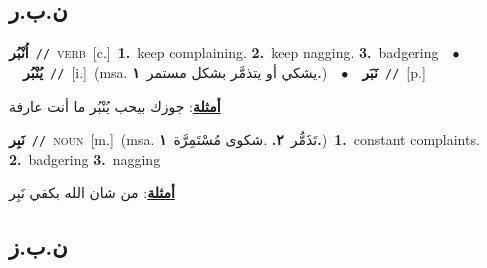 \documentclass[10pt,a4paper,twoside]{article} %
\begin{document}
\begin{multicols}{2}
{{{\vspace{-3mm}
\subsection*{\color{blue}\foreignlanguage{arabic}{ن.ب.ر}\color{blue}{}} 

{\setlength\topsep{0pt}\textbf{\foreignlanguage{arabic}{اُنْبُر}}\ {\color{gray}\texttt{//}\color{black}}\ \textsc{verb}\ [c.]\ \textbf{1.}~keep complaining.  \textbf{2.}~keep nagging.  \textbf{3.}~badgering\ \ $\bullet$\ \ \setlength\topsep{0pt}\textbf{\foreignlanguage{arabic}{يُنْبُر}}\ {\color{gray}\texttt{//}\color{black}}\ [i.]\ \color{gray}(msa. \foreignlanguage{arabic}{يشكي أو يتذمَّر بشكل مستمر}~\foreignlanguage{arabic}{\textbf{١.}})\color{black}\ \ $\bullet$\ \ \setlength\topsep{0pt}\textbf{\foreignlanguage{arabic}{نَبَر}}\ {\color{gray}\texttt{//}\color{black}}\ [p.]\  \begin{flushright}\color{gray}\foreignlanguage{arabic}{\textbf{\underline{\foreignlanguage{arabic}{أمثلة}}}: جوزك بيحب يُنْبُر ما أنت عارفة}\end{flushright}\color{black}} \vspace{2mm}

{\setlength\topsep{0pt}\textbf{\foreignlanguage{arabic}{نَبِر}}\ {\color{gray}\texttt{//}\color{black}}\ \textsc{noun}\ [m.]\ \color{gray}(msa. \foreignlanguage{arabic}{تَذَمُّر}~\foreignlanguage{arabic}{\textbf{٢.}}  .\foreignlanguage{arabic}{شكوى مُسْتَمِرَّة}~\foreignlanguage{arabic}{\textbf{١.}})\color{black}\ \textbf{1.}~constant complaints.  \textbf{2.}~badgering  \textbf{3.}~nagging\  \begin{flushright}\color{gray}\foreignlanguage{arabic}{\textbf{\underline{\foreignlanguage{arabic}{أمثلة}}}: من شان الله بكفي نَبِر}\end{flushright}\color{black}} \vspace{2mm}

\vspace{-3mm}
\subsection*{\color{blue}\foreignlanguage{arabic}{ن.ب.ز}\color{blue}{}} 

}}}
\end{multicols}
\end{document}
